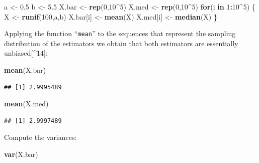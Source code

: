 \documentclass[]{krantz}
\makeatletter
\newenvironment{Shaded}{\begin{snugshade}}{\end{snugshade}}
\newcommand{\KeywordTok}[1]{\textcolor[rgb]{0.13,0.29,0.53}{\textbf{#1}}}
\newcommand{\DecValTok}[1]{\textcolor[rgb]{0.00,0.00,0.81}{#1}}
\newcommand{\FloatTok}[1]{\textcolor[rgb]{0.00,0.00,0.81}{#1}}
\newcommand{\StringTok}[1]{\textcolor[rgb]{0.31,0.60,0.02}{#1}}
\newcommand{\ControlFlowTok}[1]{\textcolor[rgb]{0.13,0.29,0.53}{\textbf{#1}}}
\newcommand{\OperatorTok}[1]{\textcolor[rgb]{0.81,0.36,0.00}{\textbf{#1}}}
\newcommand{\NormalTok}[1]{#1}
\newenvironment{kframe}{%
\medskip{}
\setlength{\fboxsep}{.8em}
 \def\at@end@of@kframe{}%
 \ifinner\ifhmode%
  \def\at@end@of@kframe{\end{minipage}}%
  \begin{minipage}{\columnwidth}%
 \fi\fi%
 \def\FrameCommand##1{\hskip\@totalleftmargin \hskip-\fboxsep
 \colorbox{shadecolor}{##1}\hskip-\fboxsep
     \hskip-\linewidth \hskip-\@totalleftmargin \hskip\columnwidth}%
 \MakeFramed {\advance\hsize-\width
   \@totalleftmargin\z@ \linewidth\hsize
   \@setminipage}}%
 {\par\unskip\endMakeFramed%
 \at@end@of@kframe}
\renewenvironment{Shaded}{\begin{kframe}}{\end{kframe}}
\theoremstyle{definition}
\theoremstyle{definition}
\theoremstyle{definition}
\theoremstyle{remark}
\makeatother
\begin{document}
\begin{enumerate}
\begin{Shaded}
\begin{Highlighting}[]
\NormalTok{a <-}\StringTok{ }\FloatTok{0.5}
\NormalTok{b <-}\StringTok{ }\FloatTok{5.5}
\NormalTok{X.bar <-}\StringTok{ }\KeywordTok{rep}\NormalTok{(}\DecValTok{0}\NormalTok{,}\DecValTok{10}\OperatorTok{^}\DecValTok{5}\NormalTok{)}
\NormalTok{X.med <-}\StringTok{ }\KeywordTok{rep}\NormalTok{(}\DecValTok{0}\NormalTok{,}\DecValTok{10}\OperatorTok{^}\DecValTok{5}\NormalTok{)}
\ControlFlowTok{for}\NormalTok{(i }\ControlFlowTok{in} \DecValTok{1}\OperatorTok{:}\DecValTok{10}\OperatorTok{^}\DecValTok{5}\NormalTok{) \{}
\NormalTok{  X <-}\StringTok{ }\KeywordTok{runif}\NormalTok{(}\DecValTok{100}\NormalTok{,a,b)}
\NormalTok{  X.bar[i] <-}\StringTok{ }\KeywordTok{mean}\NormalTok{(X)}
\NormalTok{  X.med[i] <-}\StringTok{ }\KeywordTok{median}\NormalTok{(X)}
\NormalTok{\}}
\end{Highlighting}
\end{Shaded}

  Applying the function ``\texttt{mean}'' to the sequences that
  represent the sampling distribution of the estimators we obtain that
  both estimators are essentially unbiased{[}\^{}14{]}:

\begin{Shaded}
\begin{Highlighting}[]
\KeywordTok{mean}\NormalTok{(X.bar)}
\end{Highlighting}
\end{Shaded}

\begin{verbatim}
## [1] 2.9995489
\end{verbatim}

\begin{Shaded}
\begin{Highlighting}[]
\KeywordTok{mean}\NormalTok{(X.med)}
\end{Highlighting}
\end{Shaded}

\begin{verbatim}
## [1] 2.9997489
\end{verbatim}

  Compute the variances:

\begin{Shaded}
\begin{Highlighting}[]
\KeywordTok{var}\NormalTok{(X.bar)}
\end{Highlighting}
\end{Shaded}


\end{enumerate}
\end{document}
